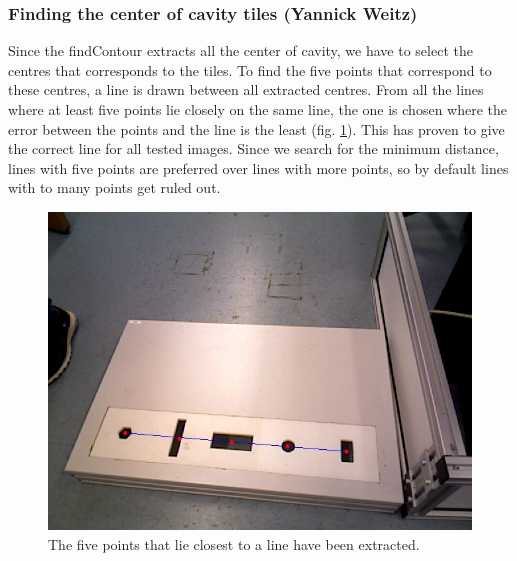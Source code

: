 \documentclass{article}
\begin{document}
\subsubsection*{Finding the center of cavity tiles (Yannick Weitz)}
Since the findContour extracts all the center of cavity, we have to select the centres that corresponds to the tiles. To find the five points that correspond to these centres, a line is drawn between all extracted centres. From all the lines where at least five points lie closely on the same line, the one is chosen where the error between the points and the line is the least (fig. \ref{fig:line}). This has proven to give the correct line for all tested images. Since we search for the minimum distance, lines with five points are preferred over lines with more points, so by default lines with to many points get ruled out.\\
\begin{figure}[h!]
\centering
\includegraphics[scale=0.3]{images/line.jpg}
\caption{The five points that lie closest to a line have been extracted.}
\label{fig:line}
\end{figure}
\end{document}
